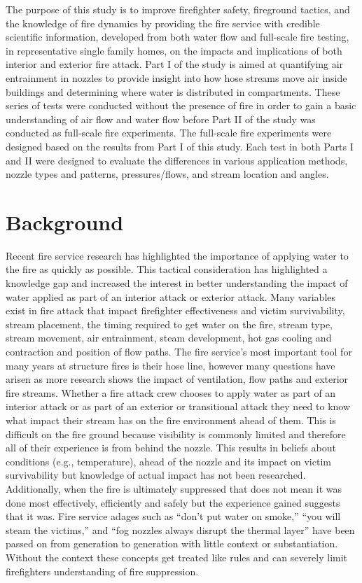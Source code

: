 \documentclass{article}
\begin{document}
The purpose of this study is to improve firefighter safety, fireground tactics, and the knowledge of fire dynamics by providing the fire service with credible scientific information, developed from both water flow and full-scale fire testing, in representative single family homes, on the impacts and implications of both interior and exterior fire attack. Part I of the study is aimed at quantifying air entrainment in nozzles to provide insight into how hose streams move air inside buildings and determining where water is distributed in compartments. These series of tests were conducted without the presence of fire in order to gain a basic understanding of air flow and water flow before Part II of the study was conducted as full-scale fire experiments. The full-scale fire experiments were designed based on the results from Part I of this study. Each test in both Parts I and II were designed to evaluate the differences in various application methods, nozzle types and patterns, pressures/flows, and stream location and angles. 

\clearpage

\section{Background}

Recent fire service research has highlighted the importance of applying water to the fire as quickly as possible. This tactical consideration has highlighted a knowledge gap and increased the interest in better understanding the impact of water applied as part of an interior attack or exterior attack. Many variables exist in fire attack that impact firefighter effectiveness and victim survivability, stream placement, the timing required to get water on the fire, stream type, stream movement, air entrainment, steam development, hot gas cooling and contraction and position of flow paths. The fire service's most important tool for many years at structure fires is their hose line, however many questions have arisen as more research shows the impact of ventilation, flow paths and exterior fire streams. Whether a fire attack crew chooses to apply water as part of an interior attack or as part of an exterior or transitional attack they need to know what impact their stream has on the fire environment ahead of them. This is difficult on the fire ground because visibility is commonly limited and therefore all of their experience is from behind the nozzle. This results in beliefs about conditions (e.g., temperature), ahead of the nozzle and its impact on victim survivability but knowledge of actual impact has not been researched. Additionally, when the fire is ultimately suppressed that does not mean it was done most effectively, efficiently and safely but the experience gained suggests that it was. Fire service adages such as ``don’t put water on smoke,'' ``you will steam the victims,'' and ``fog nozzles always disrupt the thermal layer'' have been passed on from generation to generation with little context or substantiation. Without the context these concepts get treated like rules and can severely limit firefighters understanding of fire suppression.
\end{document}
